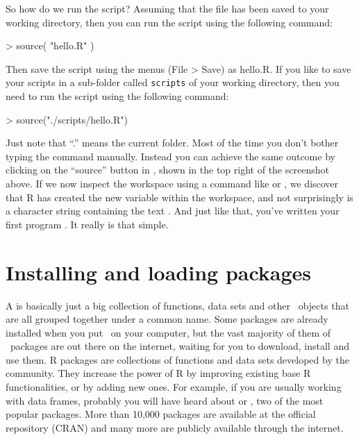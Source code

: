 So how do we run the script? Assuming that the  file has been saved to your working directory, then you can run the script using the following command:
\begin{rblock1}
> source( "hello.R" )
\end{rblock1}
Then save the script using the menus (File > Save) as hello.R.
If you like to save your scripts in a sub-folder called \texttt{scripts} of your working directory, then you need to run the script using the following command:
\begin{rblock1}
	> source("./scripts/hello.R")
\end{rblock1}
Just note that ``.'' means the current folder. 
Most of the time you don't bother typing the  command manually. Instead you can achieve the same outcome by clicking on the ``source'' button in \Rstudio, shown in the top right of the screenshot above. If we now inspect the workspace using a command like  or , we discover that R has created the new variable  within the workspace, and not surprisingly  is a character string containing the text . And just like that, you've written your first program \R. It really is that simple.






\section{Installing and loading packages~\label{sec:packageinstall}}

A  is basically just a big collection of functions, data sets and other \R\ objects that are all grouped together under a common name. Some packages are already installed when you put \R\ on your computer, but the vast majority of them of \R\ packages are out there on the internet, waiting for you to download, install and use them. 
R packages are collections of functions and data sets developed by the community. They increase the power of R by improving existing base R functionalities, or by adding new ones. For example, if you are usually working with data frames, probably you will have heard about  or , two of the most popular \R packages. More than 10,000 packages are available at the official repository (CRAN) and many more are publicly available through the internet.

